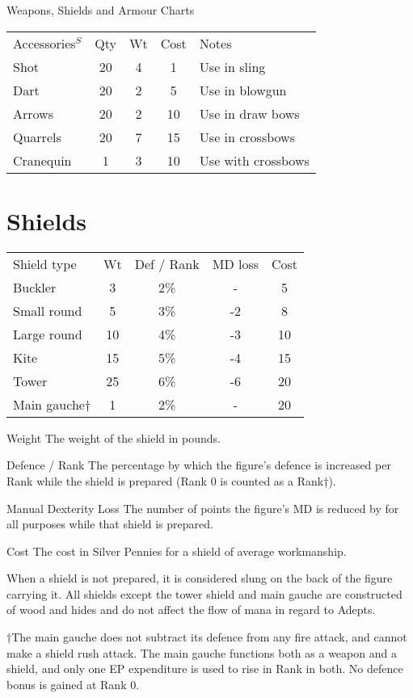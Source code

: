 \begin{Tables}{Weapons, Shields and Armour Charts}
\endgroup


\begin{tabularx}{\linewidth}{Xcccl}
Accessories$^S$	& Qty	& Wt	& Cost	& Notes \\
Shot		& 20	& 4	& 1	& Use in sling \\
Dart		& 20	& 2	& 5	& Use in blowgun \\
Arrows		& 20	& 2	& 10	& Use in draw bows \\
Quarrels	& 20	& 7	& 15	& Use in crossbows \\
Cranequin	& 1	& 3	& 10	& Use with crossbows \\
\end{tabularx}


\section{Shields}

\begin{tabularx}{\linewidth}{Xcccc}
Shield type	& Wt	& Def / Rank	& MD loss	& Cost \\
Buckler		& 3	& 2\%		& -		& 5 \\
Small round	& 5	& 3\%		& -2		& 8 \\
Large round	& 10	& 4\%		& -3		& 10 \\
Kite 		& 15	& 5\%		& -4		& 15 \\
Tower		& 25	& 6\%		& -6		& 20 \\
Main gauche†	& 1	& 2\%		& -		& 20 \\
\end{tabularx}

Weight The weight of the shield in pounds. 
 
Defence / Rank The percentage by which the figure’s defence is
increased per Rank while the shield is prepared (Rank 0 is counted as
a Rank†).
 
Manual Dexterity Loss The number of points the figure’s MD is reduced
by for all purposes while that shield is prepared.

 
Cost The cost in Silver Pennies for a shield of average workmanship.
 

When a shield is not prepared, it is considered slung on the back of
the figure carrying it.  All shields except the tower shield and main
gauche are constructed of wood and hides and do not affect the flow of
mana in regard to Adepts.

†The main gauche does not subtract its defence from any fire attack,
and cannot make a shield rush attack. The main gauche functions both
as a weapon and a shield, and only one EP expenditure is used to rise
in Rank in both.  No defence bonus is gained at Rank 0.



\end{Tables}
